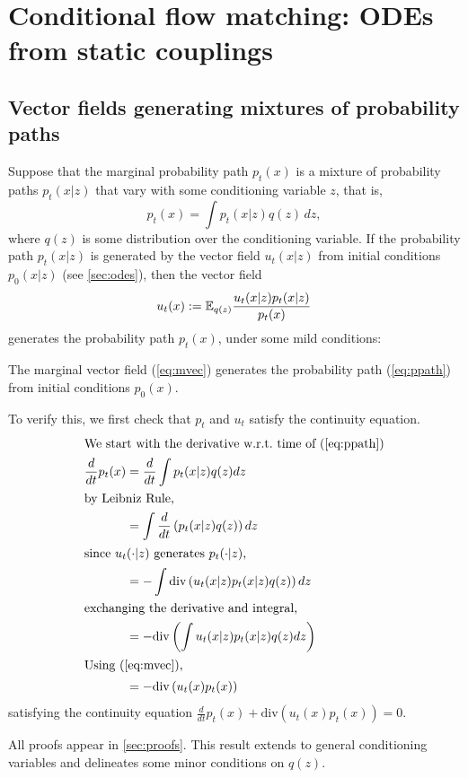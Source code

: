 \documentclass[10pt]{article}
\theoremstyle{plain}
\theoremstyle{definition}
\theoremstyle{remark}
\begin{document}
\section{Conditional flow matching: ODEs from static couplings}\label{sec:new_cfm}

\subsection{Vector fields generating mixtures of probability paths}\label{sec:cfm_alg}

Suppose that the marginal probability path $p_t(x)$ is a mixture of probability paths $p_t(x|z)$ that vary with some conditioning variable $z$, that is,
\begin{equation}\label{eq:ppath}
p_t(x) = \int p_t(x | z) q(z)\, dz,
\end{equation}
where $q(z)$ is some distribution over the conditioning variable.
If the probability path $p_t(x|z)$ is generated by the vector field $u_t(x|z)$ from initial conditions $p_0(x|z)$ (see \autoref{sec:odes}), then the vector field
\begin{equation}\label{eq:mvec}
u_t(x) := \mathbb{E}_{q(z)} \frac{u_t(x | z) p_t(x | z)}{p_t(x)}
\end{equation}
generates the probability path $p_t(x)$, under some mild conditions:
\begin{theoremE}\label{thm:marginal_vec}
The marginal vector field (\ref{eq:mvec}) generates the probability path (\ref{eq:ppath}) from initial conditions $p_0(x)$.
\end{theoremE}
\begin{proofE}
To verify this, we first check that $p_t$ and $u_t$ satisfy the continuity equation.
\begin{align*}
\shortintertext{We start with the derivative w.r.t.\ time of (\ref{eq:ppath})}
\frac{d}{dt} p_t(x)
&= \frac{d}{dt} \int p_t(x | z)q(z) dz \\
\shortintertext{by Leibniz Rule,}
&= \int \frac{d}{dt} \left (p_t(x | z)q(z) \right ) dz \\
\shortintertext{since $u_t(\cdot | z)$ generates $p_t(\cdot | z)$,}
&= -\int \mathrm{div} \left (u_t(x | z) p_t(x | z)q(z) \right ) dz \\
\shortintertext{exchanging the derivative and integral,}
&= -\mathrm{div} \left ( \int u_t(x | z) p_t(x | z)q(z)  dz \right )\\
\shortintertext{Using (\ref{eq:mvec}),}
&= -\mathrm{div} \left (u_t(x) p_t(x) \right )
\end{align*}
satisfying the continuity equation $\frac{d}{dt} p_t(x) + \mathrm{div} \left (u_t(x) p_t(x) \right ) = 0$.
\end{proofE} 
All proofs appear in \autoref{sec:proofs}. This result extends \cite[Theorem 1]{lipman_flow_2022} to general conditioning variables and delineates some minor conditions on $q(z)$. 
\end{document}
